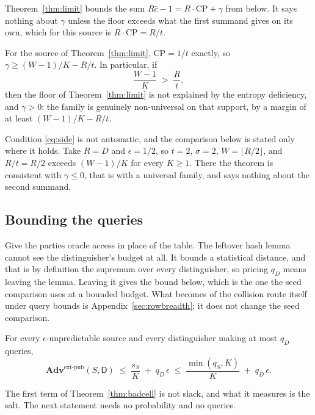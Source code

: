 \documentclass{aicr-solution}
\newcommand{\Adv}{\mathbf{Adv}}
\newcommand{\extp}{\mathrm{ext}\text{-}\mathrm{pub}}
\newcommand{\CP}{\mathrm{CP}}
\begin{document}
Theorem~\ref{thm:limit} bounds the sum $R\bar c - 1 = R\cdot\CP + \gamma$ from below. It says
nothing about $\gamma$ unless the floor exceeds what the first summand gives on its own, which for
this source is $R\cdot\CP = R/t$.

\begin{lemma}[Attribution]\label{lem:attrib}
For the source of Theorem~\ref{thm:limit}, $\CP = 1/t$ exactly, so
$\gamma \ge (W-1)/K - R/t$. In particular, if
\begin{equation}\label{eq:side}
  \frac{W-1}{K} \;>\; \frac{R}{t} ,
\end{equation}
then the floor of Theorem~\ref{thm:limit} is not explained by the entropy deficiency, and
$\gamma > 0$: the family is genuinely non-universal on that support, by a margin of at least
$(W-1)/K - R/t$.
\end{lemma}

Condition \eqref{eq:side} is not automatic, and the comparison below is stated only where it holds.
Take $R = D$ and $\epsilon = 1/2$, so $t = 2$, $\sigma = 2$, $W = \lfloor R/2\rfloor$, and $R/t = R/2$
exceeds $(W-1)/K$ for every $K \ge 1$. There the theorem is consistent with $\gamma \le 0$, that is
with a universal family, and says nothing about the second summand.


\subsection*{Bounding the queries}

Give the parties oracle access in place of the table. The leftover hash lemma cannot see the
distinguisher's budget at all. It bounds a statistical distance, and that is by definition the
supremum over every distinguisher, so pricing $q_D$ means leaving the lemma. Leaving it gives the
bound below, which is the one the seed comparison uses at a bounded budget. What becomes of the
collision route itself under query bounds is Appendix~\ref{sec:rowbreadth}; it does not change the
seed comparison.

\begin{theorem}\label{thm:badcell}
For every $\epsilon$-unpredictable source and every distinguisher making at most $q_D$ queries,
\[
  \Adv^{\extp}(S,\mathsf{D}) \;\le\; \frac{s_S}{K} \;+\; q_D\,\epsilon
  \;\le\; \frac{\min(q_S,K)}{K} \;+\; q_D\,\epsilon .
\]
\end{theorem}

The first term of Theorem~\ref{thm:badcell} is not slack, and what it measures is the salt. The
next statement needs no probability and no queries.
\end{document}
